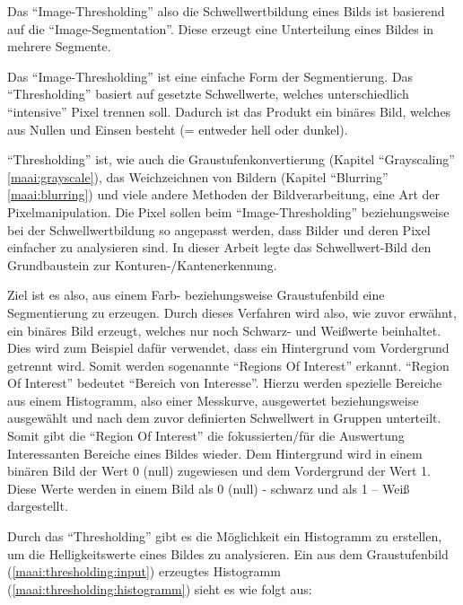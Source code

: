 Das ``Image-Thresholding'' also die Schwellwertbildung eines Bilds ist basierend auf die ``Image-Segmentation''. Diese erzeugt eine Unterteilung eines Bildes in mehrere Segmente.

Das ``Image-Thresholding'' ist eine einfache Form der Segmentierung. Das ``Thresholding'' basiert auf gesetzte Schwellwerte, welches unterschiedlich ``intensive'' Pixel trennen soll. Dadurch ist das Produkt ein binäres Bild, welches aus Nullen und Einsen besteht (= entweder hell oder dunkel).

``Thresholding'' ist, wie auch die Graustufenkonvertierung (Kapitel ``Grayscaling'' \ref{maai:grayscale}), das Weichzeichnen von Bildern (Kapitel ``Blurring'' \ref{maai:blurring}) und viele andere Methoden der Bildverarbeitung, eine Art der Pixelmanipulation. Die Pixel sollen beim ``Image-Thresholding'' beziehungsweise bei der Schwellwertbildung so angepasst werden, dass Bilder und deren Pixel einfacher zu analysieren sind. In dieser Arbeit legte das Schwellwert-Bild den Grundbaustein zur Konturen-/Kantenerkennung.

Ziel ist es also, aus einem Farb- beziehungsweise Graustufenbild eine Segmentierung zu erzeugen. Durch dieses Verfahren wird also, wie zuvor erwähnt, ein binäres Bild erzeugt, welches nur noch Schwarz- und Weißwerte beinhaltet. Dies wird zum Beispiel dafür verwendet, dass ein Hintergrund vom Vordergrund getrennt wird. Somit werden sogenannte ``Regions Of Interest'' erkannt. ``Region Of Interest'' bedeutet ``Bereich von Interesse''. Hierzu werden spezielle Bereiche aus einem Histogramm, also einer Messkurve, ausgewertet beziehungsweise ausgewählt und nach dem zuvor definierten Schwellwert in Gruppen unterteilt. Somit gibt die ``Region Of Interest'' die fokussierten/für die Auswertung Interessanten Bereiche eines Bildes wieder. Dem Hintergrund wird in einem binären Bild der Wert 0 (null) zugewiesen und dem Vordergrund der Wert 1. Diese Werte werden in einem Bild als 0 (null) - schwarz und als 1 – Weiß dargestellt.

Durch das ``Thresholding'' gibt es die Möglichkeit ein Histogramm zu erstellen, um die Helligkeitswerte eines Bildes zu analysieren. Ein aus dem Graustufenbild (\ref{maai:thresholding:input}) erzeugtes Histogramm (\ref{maai:thresholding:histogramm}) sieht es wie folgt aus:

